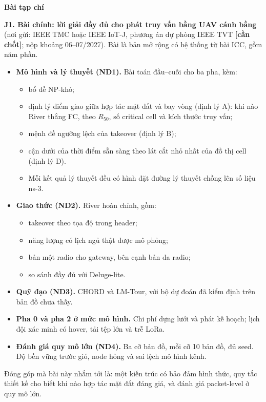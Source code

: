 \textbf{Bài tạp chí}

\textbf{J1. Bài chính: lời giải đầy đủ cho phát truy vấn bằng UAV cánh
bằng} (nơi gửi: IEEE TMC hoặc IEEE IoT-J, phương án dự phòng IEEE TVT
\textbf{{[}cần chốt{]}}; nộp khoảng 06--07/2027). Bài là bản mở rộng có
hệ thống từ bài ICC, gồm năm phần.

\begin{itemize}
\tightlist
\item
  \textbf{Mô hình và lý thuyết (ND1).} Bài toán đầu--cuối cho ba pha,
  kèm:

  \begin{itemize}
  \tightlist
  \item
    bổ đề NP-khó;
  \item
    định lý điểm giao giữa hợp tác mặt đất và bay vòng (định lý A): khi
    nào River thắng FC, theo $R_{50}$, số critical cell và kích thước truy
    vấn;
  \item
    mệnh đề ngưỡng lệch của takeover (định lý B);
  \item
    cận dưới của thời điểm sẵn sàng theo lát cắt nhỏ nhất của đồ thị
    cell (định lý D).
  \item
    Mỗi kết quả lý thuyết đều có hình đặt đường lý thuyết chồng lên số
    liệu ns-3.
  \end{itemize}
\item
  \textbf{Giao thức (ND2).} River hoàn chỉnh, gồm:

  \begin{itemize}
  \tightlist
  \item
    takeover theo tọa độ trong header;
  \item
    năng lượng có lịch ngủ thật được mô phỏng;
  \item
    bản một radio cho gateway, bên cạnh bản đa radio;
  \item
    so sánh đầy đủ với Deluge-lite.
  \end{itemize}
\item
  \textbf{Quỹ đạo (ND3).} CHORD và LM-Tour, với bộ dự đoán đã kiểm định
  trên bản đồ chưa thấy.
\item
  \textbf{Pha 0 và pha 2 ở mức mô hình.} Chi phí dựng lưới và phát kế
  hoạch; lịch đội xác minh có hover, tải tệp lớn và trễ LoRa.
\item
  \textbf{Đánh giá quy mô lớn (ND4).} Ba cỡ bản đồ, mỗi cỡ 10 bản đồ, đủ
  seed. Độ bền vững trước gió, node hỏng và sai lệch mô hình kênh.
\end{itemize}

Đóng góp mà bài này nhắm tới là: một kiến trúc có bảo đảm hình thức, quy
tắc thiết kế cho biết khi nào hợp tác mặt đất đáng giá, và đánh giá
packet-level ở quy mô lớn.

